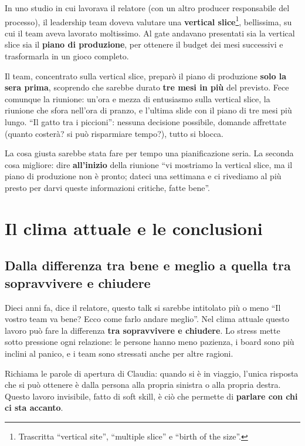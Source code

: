 In uno studio in cui lavorava il relatore (con un altro producer responsabile del
processo), il leadership team doveva valutare una \textbf{vertical
slice}\footnote{Trascritta ``vertical site'', ``multiple slice'' e ``birth of the
size''.}, bellissima, su cui il team aveva lavorato moltissimo. Al gate andavano
presentati sia la vertical slice sia il \textbf{piano di produzione}, per ottenere
il budget dei mesi successivi e trasformarla in un gioco completo.

Il team, concentrato sulla vertical slice, preparò il piano di produzione
\textbf{solo la sera prima}, scoprendo che sarebbe durato \textbf{tre mesi in più}
del previsto. Fece comunque la riunione: un'ora e mezza di entusiasmo sulla
vertical slice, la riunione che sfora nell'ora di pranzo, e l'ultima slide con il
piano di tre mesi più lungo. ``Il gatto tra i piccioni'': nessuna decisione
possibile, domande affrettate (quanto costerà? si può risparmiare tempo?), tutto si
blocca.

La cosa giusta sarebbe stata fare per tempo una pianificazione seria. La seconda
cosa migliore: dire \textbf{all'inizio} della riunione ``vi mostriamo la vertical
slice, ma il piano di produzione non è pronto; dateci una settimana e ci rivediamo
al più presto per darvi queste informazioni critiche, fatte bene''.

\section{Il clima attuale e le conclusioni}
\label{sec:c3-3-conclusioni}

\subsection{Dalla differenza tra bene e meglio a quella tra sopravvivere e
chiudere}

Dieci anni fa, dice il relatore, questo talk si sarebbe intitolato più o meno
``Il vostro team va bene? Ecco come farlo andare meglio''. Nel clima attuale questo
lavoro può fare la differenza \textbf{tra sopravvivere e chiudere}. Lo stress mette
sotto pressione ogni relazione: le persone hanno meno pazienza, i board sono più
inclini al panico, e i team sono stressati anche per altre ragioni.

Richiama le parole di apertura di Claudia: quando si è in viaggio, l'unica
risposta che si può ottenere è dalla persona alla propria sinistra o alla propria
destra. Questo lavoro invisibile, fatto di soft skill, è ciò che permette di
\textbf{parlare con chi ci sta accanto}.

